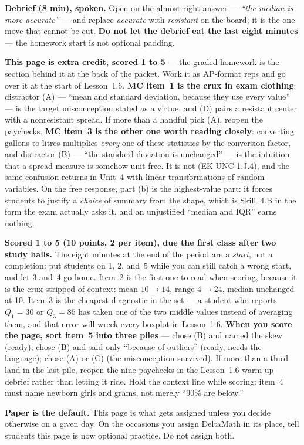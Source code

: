 \documentclass[10pt]{article}
\begin{document}
\begin{teachernote}
\textbf{Debrief (8 min), spoken.} Open on the almost-right answer --- \emph{``the median is more
accurate''} --- and replace \emph{accurate} with \emph{resistant} on the board; it is the one
move that cannot be cut. \textbf{Do not let the debrief eat the last eight minutes} --- the
homework start is not optional padding.
\end{teachernote}

\begin{teachernote}[AP Practice]
\textbf{This page is extra credit, scored 1 to 5} --- the graded homework is the section behind
it at the back of the packet. Work it as AP-format reps and go over it at the start of
Lesson~1.6. \textbf{MC item~1 is the crux in exam clothing}: distractor (A) --- ``mean and
standard deviation, because they use every value'' --- is the target misconception stated as a
virtue, and (D) pairs a resistant center with a nonresistant spread. If more than a handful pick
(A), reopen the paychecks. \textbf{MC item~3 is the other one worth reading closely}: converting
gallons to litres multiplies \emph{every} one of these statistics by the conversion factor, and
distractor (B) --- ``the standard deviation is unchanged'' --- is the intuition that a spread
measure is somehow unit-free. It is not (EK UNC-1.J.4), and the same confusion returns in Unit~4
with linear transformations of random variables. On the free response, part (b) is the
highest-value part: it forces students to justify a \emph{choice} of summary from the shape,
which is Skill~4.B in the form the exam actually asks it, and an unjustified ``median and IQR''
earns nothing.
\end{teachernote}

\begin{teachernote}[Homework]
\textbf{Scored 1 to 5 (10 points, 2 per item), due the first class after two study halls.} The eight
minutes at the end of the period are a \emph{start}, not a completion: put students on 1, 2,
and~5 while you can still catch a wrong start, and let 3 and~4 go home. Item~2 is the first one
to read when scoring, because it is the crux stripped of context: mean $10\to14$, range
$4\to24$, median unchanged at 10. Item~3 is the cheapest diagnostic in the set --- a student who
reports $Q_1=30$ or $Q_3=85$ has taken one of the two middle values instead of averaging them,
and that error will wreck every boxplot in Lesson~1.6. \textbf{When you score the page, sort
item~5 into three piles} --- chose (B) and named the skew (ready); chose (B) and said only
``because of outliers'' (ready, needs the language); chose (A) or (C) (the misconception
survived). If more than a third land in the last pile, reopen the nine paychecks in the
Lesson~1.6 warm-up debrief rather than letting it ride. Hold the context line while scoring:
item~4 must name newborn girls and grams, not merely ``90\% are below.''

\textbf{Paper is the default.} This page is what gets assigned unless you decide otherwise on a
given day. On the occasions you assign DeltaMath in its place, tell students this page is now optional practice. Do not assign both.
\end{teachernote}
\end{document}
